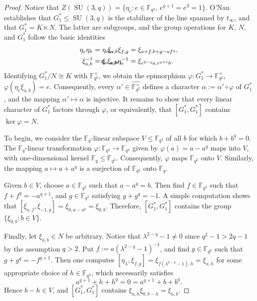 \begin{proof}
Notice that $Z(\operatorname{SU}(3,q)) = \{ \eta_e : e \in \mathbb{F}_{q^2},\, e^{q+1} = e^3 = 1 \}$.
O'Nan~\cite{ONan:72} establishes that $G_1^* \leq \operatorname{SU}(3,q)$ is the stabilizer of the line spanned by $t_\infty$,
and that $G_1^* = K \ltimes N$.
The latter are subgroups, and the group operations for $K$, $N$, and $G_1^*$ follow the basic identities 
\begin{align}
\label{eq:PSUrels}
\eta_e \eta_h &= \eta_{eh},
&\hspace{-40 pt} \xi_{a,b} \xi_{f,g} &= \xi_{a+f, b+g-af^q}, \\ \notag
\xi_{a,b}^{-1} &= \xi_{-a,b^q},
&\hspace{-40 pt} \eta_e \xi_{a,b} \eta_e^{-1} &= \xi_{e^{2-q}a,e^{q+1}b}.
\end{align}
Identifying $G_1^*/N \cong K$ with $\mathbb{F}_{q^2}^\times$, we obtain the epimorphism $\varphi \colon G_1^* \to \mathbb{F}_{q^2}^\times$, $\varphi(\eta_{e}\xi_{a,b}) = e$.
Consequently, every $\alpha' \in \widehat{ \mathbb{F}_{q^2}^\times }$ defines a character $\alpha := \alpha' \circ \varphi$ of $G_1^*$, and the mapping $\alpha' \mapsto \alpha$ is injective.
It remains to show that every linear character of $G_1^*$ factors through $\varphi$, or equivalently, that $[G_1^*,G_1^*]$ contains $\ker \varphi = N$.

To begin, we consider the $\mathbb{F}_q$-linear subspace $V \leq \mathbb{F}_{q^2}$ of all $b$ for which $b + b^q = 0$.
The $\mathbb{F}_q$-linear transformation $\varphi\colon \mathbb{F}_{q^2} \to \mathbb{F}_{q^2}$ given by $\varphi(a) = a - a^q$ maps into $V$, with one-dimensional kernel $\mathbb{F}_q \leq \mathbb{F}_{q^2}$.
Consequently, $\varphi$ maps $\mathbb{F}_{q^2}$ onto $V$.
Similarly, the mapping $a \mapsto a + a^q$ is a surjection of $\mathbb{F}_{q^2}$ onto $\mathbb{F}_q$.

Given $b \in V$, choose $a \in \mathbb{F}_{q^2}$ such that $a-a^q = b$.
Then find $f \in \mathbb{F}_{q^2}$ such that $f + f^q = -a^{q+1}$, and $g \in \mathbb{F}_{q^2}$ satisfying $ g+g^q = -1$.
A simple computation shows that $[\xi_{a,f}, \xi_{-1,g}] = \xi_{0,a-a^q} = \xi_{0,b}$.
Therefore, $[G_1^*,G_1^*]$ contains the group $\{ \xi_{0,b} : b \in V\}$.

Finally, let $\xi_{a,b} \in N$ be arbitrary.
Notice that $\lambda^{2-q} - 1 \neq 0$ since $q^2 - 1 > 2q - 1$ by the assumption $q > 2$.
Put $f := a(\lambda^{2-q} -1)^{-1}$, and find $g \in \mathbb{F}_{q^2}$ such that $g+g^q = -f^{q+1}$.
Then one computes $[\eta_\lambda, \xi_{f,g}] = \xi_{f(\lambda^{2-q}-1),h} = \xi_{a,h}$ for some appropriate choice of $h \in \mathbb{F}_{q^2}$, which necessarily satisfies 
\[ a^{q+1} + h + h^q = 0 = a^{q+1} + b + b^q. \]
Hence $b-h \in V$, and $[G_1^*,G_1^*]$ contains $\xi_{a,h} \xi_{0,b-h} = \xi_{a,b}$.
\end{proof}


